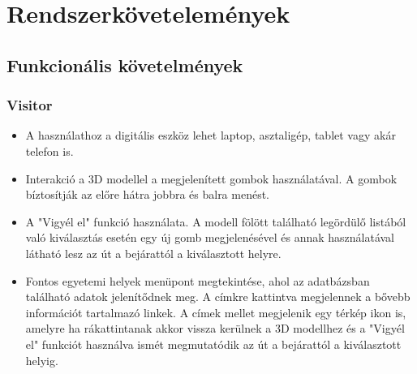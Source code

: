 \section{Rendszerkövetelemények}

\subsection{Funkcionális követelmények}
\subsubsection{Visitor}
\begin{itemize}
	\item A használathoz a digitális eszköz lehet laptop, asztaligép, tablet vagy akár telefon is. 
	\item Interakció a 3D modellel a megjelenített gombok használatával. A gombok bíztosítják az előre hátra jobbra és balra menést.
	\item A "Vigyél el" funkció használata. A modell fölött található legördülő listából való kiválasztás esetén egy új gomb megjelenésével és annak használatával látható lesz az út a bejárattól a kiválasztott helyre.
	\item Fontos egyetemi helyek menüpont megtekintése, ahol az adatbázsban található adatok jelenítődnek meg. A címkre kattintva megjelennek a bővebb információt tartalmazó linkek. A címek mellet megjelenik egy térkép ikon is, amelyre ha rákattintanak akkor vissza kerülnek a 3D modellhez és a "Vigyél el" funkciót használva ismét megmutatódik az út a bejárattól a kiválasztott helyig.
\end{itemize}

